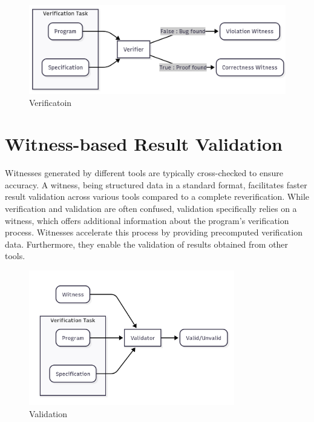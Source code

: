 \begin{figure}[h]
  \centering
  \includegraphics[width=1\textwidth]{figures/verifier.png}
  \caption{Verificatoin}
  \label{fig:Verification}
\end{figure}




  
\section{Witness-based Result Validation}
Witnesses generated by different tools are typically cross-checked to ensure accuracy. 
A witness, being structured data in a standard format, facilitates faster result validation
across various tools compared to a complete reverification. While verification and validation 
are often confused, validation specifically relies on a witness, which offers additional 
information about the program's verification process. Witnesses accelerate this process by 
providing precomputed verification data. Furthermore, they enable the validation of results 
obtained from other tools.

\begin{figure}[h]
  \centering
  \includegraphics[width=0.8\textwidth]{figures/validator.png}
  \caption{Validation}
  \label{fig:Validation}
\end{figure}

